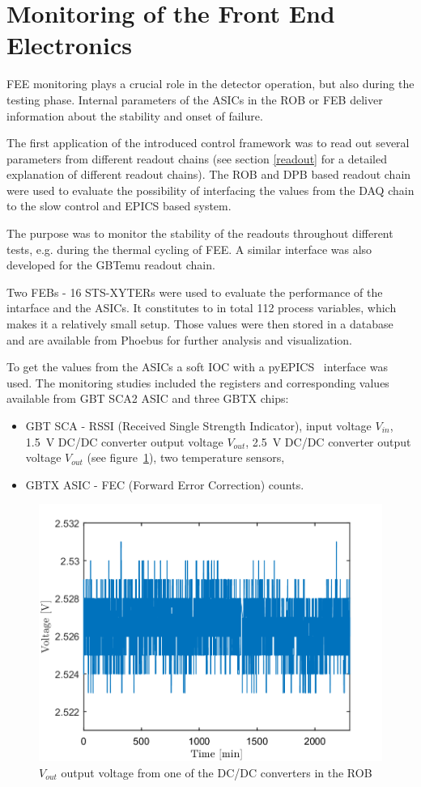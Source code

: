 
\section{Monitoring of the Front End Electronics}

\gls{FEE} monitoring plays a crucial role in the detector operation, but also during the testing phase. Internal parameters of the \glspl{ASIC} in the \gls{ROB} or \gls{FEB} deliver information about the stability and onset of failure.


The first application of the introduced control framework was to read out several parameters from different readout chains (see section \ref{readout} for a detailed explanation of different readout chains). The \gls{ROB} and \gls{DPB} based readout chain were used to evaluate the possibility of interfacing the values from the \gls{DAQ} chain to the slow control and \gls{EPICS} based system.

The purpose was to monitor the stability of the readouts throughout different tests, e.g. during the thermal cycling of \gls{FEE}. A similar interface was also developed for the GBTemu readout chain. 

Two \glspl{FEB} - 16 STS-XYTERs were used to evaluate the performance of the intarface and the ASICs. It constitutes to in total 112 process variables, which makes it a relatively small setup. Those values were then stored in a database and are available from Phoebus for further analysis and visualization.

To get the values from the \glspl{ASIC} a soft \gls{IOC} with a pyEPICS~\cite{pyEPICS} interface was used. The monitoring studies included the registers and corresponding values available from \gls{GBT} \gls{SCA2} \gls{ASIC} \cite{GBT_SCA_ASIC} and three GBTX chips: 
\begin{itemize}
    \item GBT SCA - RSSI (Received Single Strength Indicator), input voltage $V_{in}$, 1.5~V DC/DC converter output voltage $V_{out}$, 2.5~V DC/DC converter output voltage $V_{out}$ (see figure~\ref{fig:ROB}), two temperature sensors,
    \item GBTX \gls{ASIC} - FEC (Forward Error Correction) counts.
\end{itemize}

\begin{figure}[!h]
    \centering
    \includegraphics[width=0.65\columnwidth]{Chapter4/images/ROB.png}
    \caption{$V_{out}$ output voltage from one of the DC/DC converters in the \gls{ROB}}
    \label{fig:ROB}
\end{figure}

